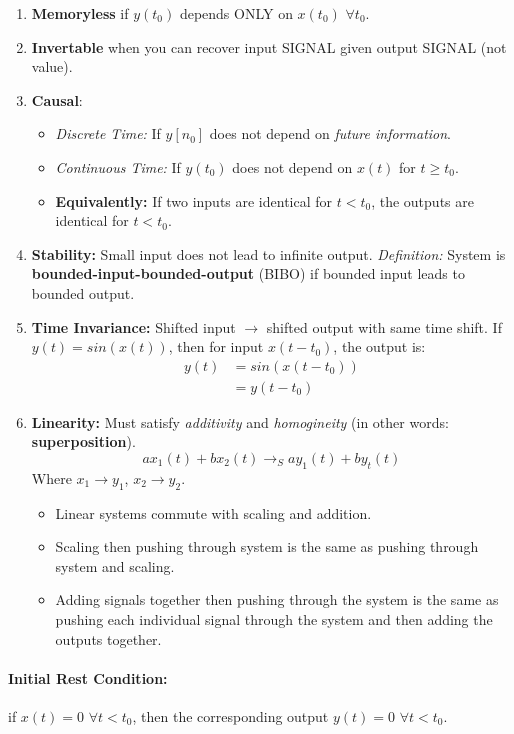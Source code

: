 \documentclass[a4paper,12pt]{report}
\begin{document}
\begin{enumerate}
\item \textbf{Memoryless} if $y(t_0)$ depends ONLY on $x(t_0)$ $\forall t_0$.
\item \textbf{Invertable} when you can recover input SIGNAL given output SIGNAL (not value).
\item \textbf{Causal}:
\begin{itemize}
\item \textit{Discrete Time: } If $y[n_0]$ does not depend on \textit{future information}.
\item \textit{Continuous Time: } If $y(t_0)$ does not depend on $x(t)$ for $t \geq t_0$.
\item \textbf{Equivalently: } If two inputs are identical for $t < t_0$, the outputs are identical for $t < t_0$.
\end{itemize}
\item \textbf{Stability: } Small input does not lead to infinite output. \textit{Definition: } System is \textbf{bounded-input-bounded-output} (BIBO) if bounded input leads to bounded output.
\item \textbf{Time Invariance: } Shifted input $\to$ shifted output with same time shift. If $y(t) = sin(x(t))$, then for input $x(t-t_0)$, the output is: 
\begin{equation}
\begin{split}
y(t) &= sin(x(t-t_0)) \\
&= y(t-t_0)
\end{split}
\end{equation}
\item \textbf{Linearity: } Must satisfy \textit{additivity} and \textit{homogineity} (in other words: \textbf{superposition}).
$$ax_1(t) + bx_2(t) \to_S ay_1(t) + by_t(t)$$
Where $x_1 \to y_1$, $x_2 \to y_2$.
\begin{itemize}
\item Linear systems commute with scaling and addition. 
\item Scaling then pushing through system is the same as pushing through system and scaling. 
\item Adding signals together then pushing through the system is the same as pushing each individual signal through the system and then adding the outputs together.
\end{itemize}
\end{enumerate}


\paragraph{Initial Rest Condition: } if $x(t) = 0$ $\forall t < t_0$, then the corresponding output $y(t) = 0$ $\forall t< t_0$.
\end{document}
